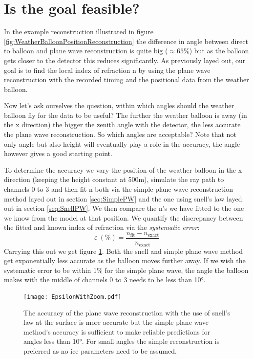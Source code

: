 \section{Is the goal feasible?}
\label{sec:feasible}
In the example reconstruction illustrated in figure
\ref{fig:WeatherBalloonPositionReconstruction} the difference in angle between
direct to balloon and plane wave reconstruction is quite big
($\approx 65\%$) but as the balloon gets closer to the detector this reduces
significantly. As previously layed out, our goal is to find the local index of refraction n by using the
plane wave reconstruction with the recorded timing and the positional data from
the weather balloon.

Now let's ask ourselves the question, within which angles should the
weather balloon fly for the data to be useful?  The
further the weather balloon is away (in the x direction) the bigger the zenith
angle with the detector, the less accurate the plane wave reconstruction.  So
which angles are acceptable? Note that not only angle but also height will eventually
play a role in the accuracy, the angle however gives a good starting point.

To determine the accuracy we vary the position of the weather balloon in the x direction (keeping the
height constant at 500m), simulate the ray path to channels 0 to 3 and then fit n
both via the simple plane wave reconstruction method layed out in section \ref{seq:SimplePW} and
the one using snell's law layed out in section \ref{seq:SnellPW}.
We then compare the n's we have fitted  to the
one we know from the model at that position.  We quantify the discrepancy
between the fitted and known index of refraction via the
\textit{systematic error}:
\begin{equation}
  \varepsilon\ (\%) = \frac{n_\text{fit} - n_{\text{exact}}}{n_{\text{exact}}}
\end{equation}
Carrying this out we get figure
\ref{fig:EpsilonIFODirect}. Both the snell and simple plane wave method get
exponentially less accurate as the balloon moves further away.  If we wish the
systematic error to be within 1\% for the simple plane wave, the angle the
balloon makes with the middle of channels 0 to 3 needs to be less than 10°.
\begin{figure}
	\centering
	\texttt{[image: EpsilonWithZoom.pdf]}
	\caption{The accuracy of the plane wave reconstruction with the use of snell's law at the surface is more 
  accurate but the simple plane wave method's accuracy is sufficient to make reliable
predictions for angles less than 10°. For small angles the simple reconstruction is preferred as no ice 
parameters need to be assumed.}
	\label{fig:EpsilonIFODirect}
\end{figure}

